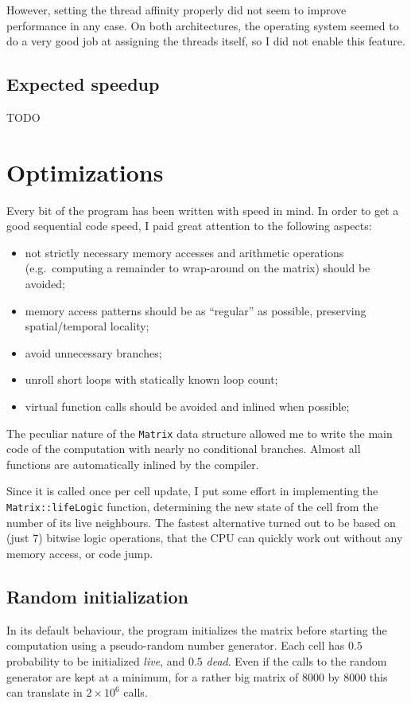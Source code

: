 \documentclass[a4paper,11pt]{article}
\newcommand{\code}[1]{\texttt{#1}}
\def\+{\discretionary{}{}{}}
\begin{document}
However, setting the thread affinity properly did not seem to improve performance in any case. On both architectures, the operating system seemed to do a very good job at assigning the threads itself, so I did not enable this feature.

\subsection{Expected speedup}

TODO

\section{Optimizations}

Every bit of the program has been written with speed in mind. In order to get a good sequential code speed, I paid great attention to the following aspects:
\begin{itemize}
\item not strictly necessary memory accesses and arithmetic operations (e.g.\ computing a remainder to wrap-around on the matrix) should be avoided;
\item memory access patterns should be as ``regular'' as possible, preserving spatial/temporal locality;
\item avoid unnecessary branches;
\item unroll short loops with statically known loop count;
\item virtual function calls should be avoided and inlined when possible;
\end{itemize}

The peculiar nature of the \code{Matrix} data structure allowed me to write the main code of the computation with nearly no conditional branches. Almost all functions are automatically inlined by the compiler.

Since it is called once per cell update, I put some effort in implementing the \code{Matrix::\+lifeLogic} function, determining the new state of the cell from the number of its live neighbours. The fastest alternative turned out to be based on (just $7$) bitwise logic operations, that the CPU can quickly work out without any memory access, or code jump.

\subsection{Random initialization}

In its default behaviour, the program initializes the matrix before starting the computation using a pseudo-random number generator. Each cell has $0.5$ probability to be initialized \emph{live}, and $0.5$ \emph{dead}. Even if the calls to the random generator are kept at a minimum, for a rather big matrix of $8000$ by $8000$ this can translate in $2 \times 10^6$ calls.
\end{document}

